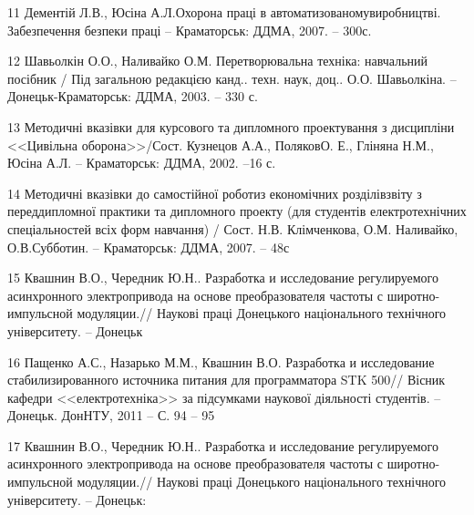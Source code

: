         11	Дементій Л.В., Юсіна А.Л.Охорона праці в
        автоматизованомувиробництві. Забезпечення безпеки праці – Краматорськ:
        ДДМА, 2007. – 300с.

        12	Шавьолкін О.О., Наливайко О.М. Перетворювальна техніка: навчальний
        посібник / Під загальною редакцією канд.. техн. наук,  доц.. О.О.
        Шавьолкіна. – Донецьк-Краматорськ: ДДМА, 2003. – 330 с.

        13	Методичні вказівки для курсового та дипломного проектування з
        дисципліни <<Цивільна оборона>>/Сост. Кузнецов А.А., ПоляковО. Е.,
        Гліняна Н.М., Юсіна А.Л. – Краматорськ: ДДМА, 2002. –16 с.

        14	Методичні вказівки до самостійної роботиз економічних розділівзвіту
        з переддипломної практики та дипломного проекту (для студентів
        електротехнічних спеціальностей всіх форм навчання) / Сост. Н.В.
        Клімченкова, О.М. Наливайко, О.В.Субботин. – Краматорськ: ДДМА, 2007. –
        48с

        15 Квашнин В.О., Чередник Ю.Н.. Разработка и исследование регулируемого
        асинхронного электропривода на основе преобразователя частоты  с
        широтно-импульсной модуляции.// Наукові праці Донецького національного
        технічного університету. – Донецьк

        16 Пащенко А.С., Назарько М.М., Квашнин В.О. Разработка и исследование
        стабилизированного источника питания для программатора STK 500// Вісник
        кафедри <<електротехніка>> за підсумками наукової діяльності студентів. –
        Донецьк. ДонНТУ, 2011 – С. 94 – 95

        17 Квашнин В.О., Чередник Ю.Н.. Разработка и исследование регулируемого
        асинхронного электропривода на основе преобразователя частоты  с
        широтно-импульсной модуляции.// Наукові праці Донецького національного
        технічного університету. – Донецьк: 

